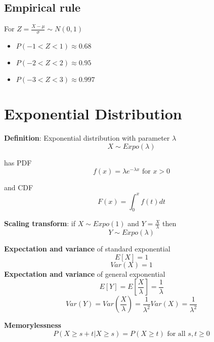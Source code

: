\subsection{Empirical rule}

For $Z = \frac{X - \mu}{\sigma} \sim N(0, 1)$
\begin{itemize}
   \item $P( -1 < Z < 1) \approx 0.68$
   \item $P( -2 < Z < 2) \approx 0.95$
   \item $P( -3 < Z < 3) \approx 0.997$
\end{itemize}

\section{Exponential Distribution}

\begin{framed}
   \textbf{Definition}: Exponential distribution with parameter $\lambda$ 
   \[
     X \sim Expo(\lambda)
   \] 

   has PDF
   \[
      f(x) = \lambda e^{ - \lambda x} \text{ for } x > 0
   \] 

   and CDF
   \[
     F(x) = \int_{0}^{x}  f(t) dt 
   \] 

   \textbf{Scaling transform}: if $X \sim Expo(1) $ and $Y = \frac{X }{\lambda}$ then
   \[
     Y \sim Expo(\lambda)
   \] 

   \textbf{Expectation and variance} of standard exponential
   \[
      E[X] = 1 
   \] 
   \[
     Var(X) = 1
   \] 
   \textbf{Expectation and variance} of general exponential
   \[
      E[Y] = E\left[ \frac{X}{ \lambda}\right]  = \frac{1}{\lambda}
   \] 
   \[
     Var(Y) = Var \left( \frac{X}{ \lambda} \right)  = \frac{1}{\lambda^2} Var(X) = \frac{1}{\lambda^2}
   \] 

   \textbf{Memorylessness}
   \[
     P(X \geq s + t | X \geq s) = P(X \geq t) \text{ for all } s, t \geq 0
   \] 
\end{framed}

